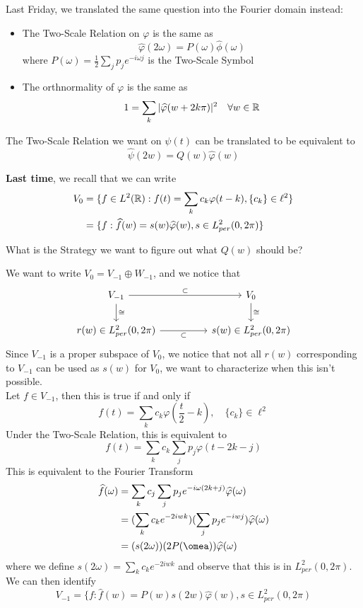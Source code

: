 \documentclass{article}
\begin{document}
{Last Friday, we translated the same question into the Fourier domain instead:
\begin{itemize}
    \item The Two-Scale Relation on $\varphi$ is the same as
    \[\widehat{\varphi}(2\omega) = P(\omega) \widehat{\phi}(\omega)\]
    where $P(\omega) = \frac{1}{2} \sum_j p_j e^{-i\omega j}$ is the Two-Scale Symbol
    \item The orthnormality of $\varphi$ is the same as
    \[1 = \sum_k |\widehat{\varphi}(w + 2k\pi)|^2\quad \forall w \in \mathbb{R}\]
\end{itemize}
The Two-Scale Relation we want on $\psi(t)$ can be translated to be equivalent to
\[\widehat{\psi}(2w) = Q(w) \widehat{\varphi}(w)\]

\textbf{Last time}, we recall that we can write
\begin{align*}
    V_0 &= \{ f \in L^2(\mathbb{R}): f(t) = \sum_{k} c_k \varphi(t - k), \{c_k\} \in \ell^2\}\\
    &= \{f: \widehat{f}(w) = s(w) \widehat{\varphi}(w), s \in L^2_{per}(0, 2\pi)\}
\end{align*}

\begin{question}
    What is the Strategy we want to figure out what $Q(w)$ should be?
\end{question}

We want to write $V_0 = V_{-1} \oplus W_{-1}$, and we notice that
\[\begin{tikzcd}
	{V_{-1}} && {V_0} \\
	{r(w) \in L^2_{per}(0, 2\pi)} && {s(w) \in L^2_{per}(0, 2\pi)}
	\arrow["\subset", from=1-1, to=1-3]
	\arrow["\cong", from=1-3, to=2-3]
	\arrow["\cong", from=1-1, to=2-1]
	\arrow["\subset"', from=2-1, to=2-3]
\end{tikzcd}\]
Since $V_{-1}$ is a proper subspace of $V_0$, we notice that not all $r(w)$ corresponding to $V_{-1}$ can be used as $s(w)$ for $V_0$, we want to characterize when this isn't possible.\\

Let $f \in V_{-1}$, then this is true if and only if
\[f(t) = \sum_k c_k \varphi(\frac{t}{2} - k), \quad \{c_k\} \in \ell^2\]
Under the Two-Scale Relation, this is equivalent to
\[f(t) = \sum_k c_k \sum_j p_j \varphi(t - 2k - j)\]
This is equivalent to the Fourier Transform
\begin{align*}
    \widehat{f}(\omega) &= \sum_k c_j \sum_j p_j e^{-i\omega (2k + j)} \widehat{\varphi}(\omega)\\
    &= (\sum_k c_k e^{-2iwk})(\sum_j p_j e^{-iwj}) \widehat{\varphi}(\omega)\\
    &= (s(2\omega))(2 P(\omea)) \widehat{\varphi}(\omega)
\end{align*}
where we define $s(2\omega) = \sum_k c_k e^{-2iwk}$ and observe that this is in $L^2_{per}(0, 2\pi)$. We can then identify
\[V_{-1} = \{f: \widehat{f}(w) = P(w) s(2w) \widehat{\varphi}(w), s \in L^2_{per}(0, 2\pi)\]

}
\end{document}
